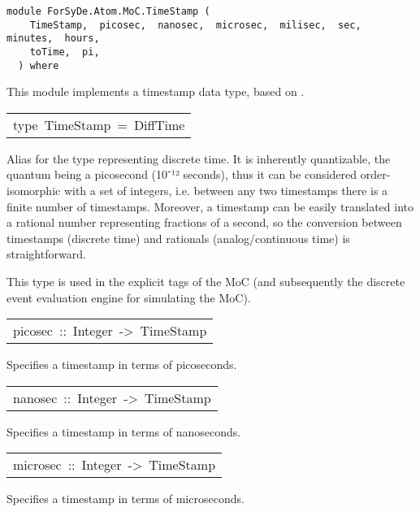 \label{module:ForSyDe.Atom.MoC.TimeStamp}
\haddockbeginheader
{\haddockverb\begin{verbatim}
module ForSyDe.Atom.MoC.TimeStamp (
    TimeStamp,  picosec,  nanosec,  microsec,  milisec,  sec,  minutes,  hours, 
    toTime,  pi, 
  ) where\end{verbatim}}
\haddockendheader

This module implements a timestamp data type, based on
 . \par

\begin{haddockdesc}
\item[\begin{tabular}{@{}l}
type\ TimeStamp\ =\ DiffTime
\end{tabular}]\haddockbegindoc
Alias for the type representing discrete time. It is inherently
 quantizable, the quantum being a picosecond (10⁻¹²
 seconds), thus it can be considered order-isomorphic with a set of
 integers, i.e. between any two timestamps there is a finite number
 of timestamps. Moreover, a timestamp can be easily translated into
 a rational number representing fractions of a second, so the
 conversion between timestamps (discrete time) and rationals
 (analog/continuous time) is straightforward.\par
This type is used in the explicit tags of the
  MoC (and subsequently the discrete event
 evaluation engine for simulating the  MoC).\par


\item[\begin{tabular}{@{}l}
picosec\ ::\ Integer\ ->\ TimeStamp
\end{tabular}]\haddockbegindoc
Specifies a timestamp in terms of picoseconds.\par


\item[\begin{tabular}{@{}l}
nanosec\ ::\ Integer\ ->\ TimeStamp
\end{tabular}]\haddockbegindoc
Specifies a timestamp in terms of nanoseconds.\par


\item[\begin{tabular}{@{}l}
microsec\ ::\ Integer\ ->\ TimeStamp
\end{tabular}]\haddockbegindoc
Specifies a timestamp in terms of microseconds.\par



\end{haddockdesc}
